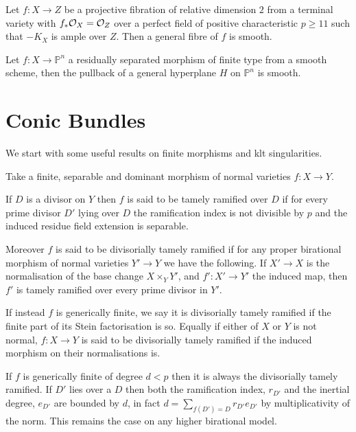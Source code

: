 \begin{theorem}\cite[Corollary 1.6]{patakfalvi2017singularities}\label{smoothness}
	Let $f\colon X \to Z$ be a projective fibration of relative dimension $2$ from a terminal variety with $f_{*}\mathcal{O}_{X}=\mathcal{O}_{Z}$ over a perfect field of positive characteristic $p \geq 11$ such that $-K_{X}$ is ample over $Z$. Then a general fibre of $f$ is smooth.
\end{theorem}

\begin{theorem}\cite[Theorem 1]{cumino1986axiomatic}\label{Bertini}
	Let $f\colon X \to \mathbb{P}^{n}$ a residually separated morphism of finite type from a smooth scheme, then the pullback of a general hyperplane $H$ on $\mathbb{P}^{n}$ is smooth.
\end{theorem}



\section{Conic Bundles}
	We start with some useful results on finite morphisms and klt singularities.
	
	\begin{definition}
		Take a finite, separable and dominant morphism of normal varieties $f\colon X \to Y$.
		
		If $D$ is a divisor on $Y$ then $f$ is said to be tamely ramified over $D$ if for every prime divisor $D'$ lying over $D$ the ramification index is not divisible by $p$ and the induced residue field extension is separable.
		
		Moreover $f$ is said to be divisorially tamely ramified if for any proper birational morphism of normal varieties $Y' \to Y$ we have the following. If $X' \to X$ is the normalisation of the base change $X\times_{Y}Y'$, and $f'\colon X'\to Y'$  the induced map, then $f'$ is tamely ramified over every prime divisor in $Y'$.
		
		If instead $f$ is generically finite, we say it is divisorially tamely ramified if the finite part of its Stein factorisation is so. Equally if either of $X$ or $Y$ is not normal, $f\colon X \to Y$ is said to be divisorially tamely ramified if the induced morphism on their normalisations is.
	\end{definition}
	
	If $f$ is generically finite of degree $d <p$ then it is always the divisorially tamely ramified. If $D'$ lies over a $D$ then both the ramification index, $r_{D'}$ and the inertial degree, $e_{D'}$ are bounded by $d$, in fact $d= \sum_{f(D')=D} r_{D'}e_{D'}$ by multiplicativity of the norm. This remains the case on any higher birational model.
	
